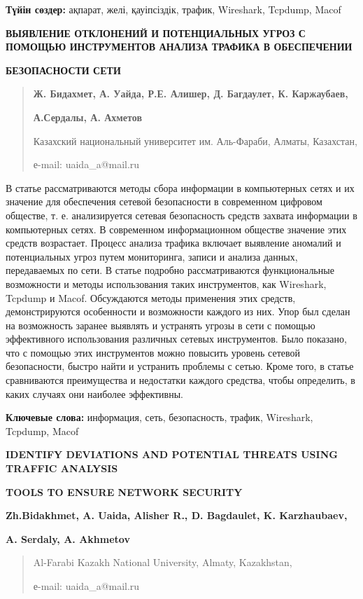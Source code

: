 \textbf{Түйін сөздер:} ақпарат, желі, қауіпсіздік, трафик, Wireshark,
Tcpdump, Macof

\textbf{ВЫЯВЛЕНИЕ ОТКЛОНЕНИЙ И ПОТЕНЦИАЛЬНЫХ УГРОЗ С ПОМОЩЬЮ
ИНСТРУМЕНТОВ АНАЛИЗА ТРАФИКА В ОБЕСПЕЧЕНИИ}

\textbf{БЕЗОПАСНОСТИ СЕТИ}

\begin{quote}
\textbf{Ж. Бидахмет, А. Уайда, Р.Е. Алишер, Д. Багдаулет, К.
Каржаубаев,}

\textbf{А.Сердалы, А. Ахметов}

Казахский национальный университет им. Аль-Фараби, Алматы, Казахстан,

е-mail: uaida\_a@mail.ru
\end{quote}

В статье рассматриваются методы сбора информации в компьютерных сетях и
их значение для обеспечения сетевой безопасности в современном цифровом
обществе, т. е. анализируется сетевая безопасность средств захвата
информации в компьютерных сетях. В современном информационном обществе
значение этих средств возрастает. Процесс анализа трафика включает
выявление аномалий и потенциальных угроз путем мониторинга, записи и
анализа данных, передаваемых по сети. В статье подробно рассматриваются
функциональные возможности и методы использования таких инструментов,
как Wireshark, Tcpdump и Macof. Обсуждаются методы применения этих
средств, демонстрируются особенности и возможности каждого из них. Упор
был сделан на возможность заранее выявлять и устранять угрозы в сети с
помощью эффективного использования различных сетевых инструментов. Было
показано, что с помощью этих инструментов можно повысить уровень сетевой
безопасности, быстро найти и устранить проблемы с сетью. Кроме того, в
статье сравниваются преимущества и недостатки каждого средства, чтобы
определить, в каких случаях они наиболее эффективны.

\textbf{Ключевые слова:} информация, сеть, безопасность, трафик,
Wireshark, Tcpdump, Macof

\textbf{IDENTIFY DEVIATIONS AND POTENTIAL THREATS USING TRAFFIC
ANALYSIS}

\textbf{TOOLS TO ENSURE NETWORK SECURITY}

\textbf{Zh.Bidakhmet, A. Uaida, Alisher R., D. Bagdaulet, K.
Karzhaubaev,}

\textbf{A. Serdaly, A. Akhmetov}

\begin{quote}
Al-Farabi Kazakh National University, Almaty, Kazakhstan,

е-mail: uaida\_a@mail.ru
\end{quote}

